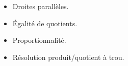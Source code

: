 \begin{prerequis}[Prérequis]    
    \begin{itemize}        
        \item Droites parallèles.
        \item Égalité de quotients.
        \item Proportionnalité.        
        \item Résolution produit/quotient à trou.
    \end{itemize}
\end{prerequis}
